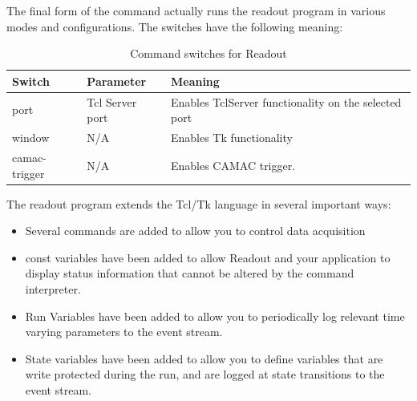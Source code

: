    \begin{example}
   \end{example}
   
   The final form of the command actually runs the readout program 
   in various modes and configurations.  The switches have the 
   following meaning:
   
   \begin{table}[htp]
      \caption{Command switches for Readout}
      \begin{tabular}{|l|l|l|}
	 \hline
	 {\bf Switch} & {\bf Parameter} & {\bf Meaning} \\
	 \hline
	 {\dash\dash}port   & Tcl Server port & Enables TclServer functionality on the 
					  selected port \\
	 {\dash\dash}window & N/A		& Enables Tk functionality \\
	 {\dash\dash}camac-trigger & N/A		& Enables CAMAC trigger. \\
	 \hline
      \end{tabular}
   \end{table}
      The readout program extends the Tcl/Tk language in several important ways:
      \begin{itemize}
	 \item Several commands are added to allow you to control
	    data acquisition
	 \item const variables have been added to allow Readout and
	    your application to display status information that cannot
	    be altered by the command interpreter.
	 \item Run Variables have been added to allow you to 
	    periodically log relevant time varying parameters to the
	    event stream.
	 \item State variables have been added to allow you to define
	    variables that are write protected during the run, and are
	    logged at state transitions to the event stream.
      \end{itemize}
      
